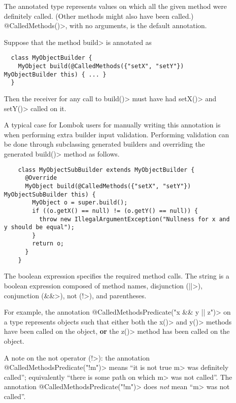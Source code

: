 \begin{description}
\item[]
  The annotated type represents values on which all the given method were definitely called.
  (Other methods might also have been called.) \<@CalledMethods()>, with no
  arguments, is the default annotation.

  Suppose that the method \<build> is annotated as

  \begin{Verbatim}
  class MyObjectBuilder {
    MyObject build(@CalledMethods({"setX", "setY"}) MyObjectBuilder this) { ... }
  }
  \end{Verbatim}

  Then the receiver for any call to \<build()> must have had \<setX()> and \<setY()> called on it.

  A typical case for Lombok users for manually writing this annotation is when performing extra
  builder input validation. Performing validation can be done through subclassing generated builders
  and overriding the generated \<build()> method as follows.

  \begin{Verbatim}
    class MyObjectSubBuilder extends MyObjectBuilder {
      @Override
      MyObject build(@CalledMethods({"setX", "setY"}) MyObjectSubBuilder this) {
        MyObject o = super.build();
        if ((o.getX() == null) != (o.getY() == null)) {
          throw new IllegalArgumentException("Nullness for x and y should be equal");
        }
        return o;
      }
    }
  \end{Verbatim}

\item[]
  The boolean expression specifies the required method calls.  The string
  is a boolean expression composed of method names, disjunction (\<||>),
  conjunction (\<\&\&>), not (\<!>), and parentheses.

  For example, the annotation \<@CalledMethodsPredicate("x \&\& y || z")> on a type represents
  objects such that either both the  \<x()> and \<y()> methods have been called on the object, \textbf{or}
  the \<z()> method has been called on the object.

  A note on the not operator (\<!>): the annotation
  \<@CalledMethodsPredicate("!m")> means ``it is not true \<m> was
  definitely called''; equivalently ``there is some path on which \<m> was
  not called''.  The annotation \<@CalledMethodsPredicate("!m")> does
  \emph{not} mean ``\<m> was not called''.


\end{description}
